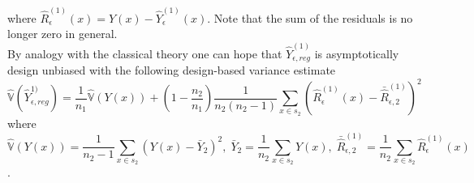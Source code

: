 \documentclass[a4paper,12pt,leqno, titlepage]{article}
\newcommand{\VAR}{\mathbb{V}}
\begin{document}
where $\hat{R}^{(1)}_{\epsilon}(x)=Y(x)-\hat{Y}^{(1)}_{\epsilon}(x)$. Note that the sum of the residuals is no longer zero in general.
 \\By analogy with the classical theory one can hope that $\hat{Y}^{(1)}_{\epsilon,reg}$ is asymptotically design unbiased with the following design-based variance estimate
\begin{equation}\label{estvarkernelyreg}
\hat{\VAR}(\hat{Y}^{1)}_{\epsilon,reg})=\frac{1}{n_1}\hat{\VAR}(Y(x))+(1-\frac{n_2}{n_1})\frac{1}{n_2(n_2-1)}
\sum_{x\in{s_2}}(\hat{R}^{(1)}_{\epsilon}(x)-\bar{\hat{R}}^{(1)}_{\epsilon,2})^2
\end{equation}
where
$$\hat{\VAR}(Y(x))=\frac{1}{n_2-1}\sum_{x\in{s_2}}(Y(x)-\bar{Y}_2)^2, \; \bar{Y}_2=\frac{1}{n_2}\sum_{x\in{s_2}}Y(x),\;\bar{\hat{R}}^{(1)}_{\epsilon,2}=\frac{1}{n_2}
\sum_{x\in{s_2}}\hat{R}^{(1)}_{\epsilon}(x)$$.
\end{document}
